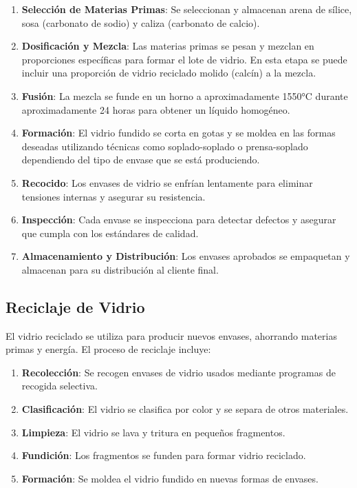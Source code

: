 \documentclass[main.tex]{subfiles}
\begin{document}
\begin{enumerate}
    \item \textbf{Selección de Materias Primas}: Se seleccionan y almacenan arena de sílice, sosa (carbonato de sodio) y caliza (carbonato de calcio).
    \item \textbf{Dosificación y Mezcla}: Las materias primas se pesan y mezclan en proporciones específicas para formar el lote de vidrio. En esta etapa se puede incluir una proporción de vidrio reciclado molido (calcín) a la mezcla.
    \item \textbf{Fusión}: La mezcla se funde en un horno a aproximadamente 1550°C durante aproximadamente 24 horas para obtener un líquido homogéneo.
    \item \textbf{Formación}: El vidrio fundido se corta en gotas y se moldea en las formas deseadas utilizando técnicas como soplado-soplado o prensa-soplado dependiendo del tipo de envase que se está produciendo.
    \item \textbf{Recocido}: Los envases de vidrio se enfrían lentamente para eliminar tensiones internas y asegurar su resistencia.
    \item \textbf{Inspección}: Cada envase se inspecciona para detectar defectos y asegurar que cumpla con los estándares de calidad.
    \item \textbf{Almacenamiento y Distribución}: Los envases aprobados se empaquetan y almacenan para su distribución al cliente final.
\end{enumerate}

\subsection{Reciclaje de Vidrio}

El vidrio reciclado se utiliza para producir nuevos envases, ahorrando materias primas y energía. El proceso de reciclaje incluye:

\begin{enumerate}
    \item \textbf{Recolección}: Se recogen envases de vidrio usados mediante programas de recogida selectiva.
    \item \textbf{Clasificación}: El vidrio se clasifica por color y se separa de otros materiales.
    \item \textbf{Limpieza}: El vidrio se lava y tritura en pequeños fragmentos.
    \item \textbf{Fundición}: Los fragmentos se funden para formar vidrio reciclado.
    \item \textbf{Formación}: Se moldea el vidrio fundido en nuevas formas de envases.
\end{enumerate}
\end{document}
